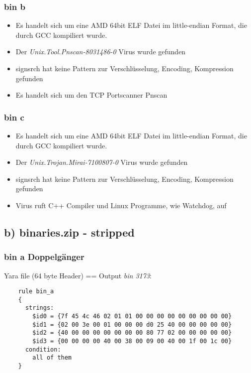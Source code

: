 \subsubsection*{bin b}

\begin{itemize}
    \item Es handelt sich um eine AMD 64bit ELF Datei im little-endian Format, die durch GCC kompiliert wurde.
    \item Der \textit{Unix.Tool.Pnscan-8031486-0} Virus wurde gefunden
    \item signsrch hat keine Pattern zur Verschlüsselung, Encoding, Kompression gefunden
    \item Es handelt sich um den TCP Portscanner Pnscan
\end{itemize}

\subsubsection*{bin c}

\begin{itemize}
    \item Es handelt sich um eine AMD 64bit ELF Datei im little-endian Format, die durch GCC kompiliert wurde.
    \item Der \textit{Unix.Trojan.Mirai-7100807-0} Virus wurde gefunden
    \item signsrch hat keine Pattern zur Verschlüsselung, Encoding, Kompression gefunden
    \item Virus ruft C++ Compiler und Linux Programme, wie Watchdog, auf
\end{itemize}

\subsection*{b) binaries.zip - stripped}

\subsubsection*{bin a Doppelgänger}

Yara file (64 byte Header) == Output \textit{bin 3173}:

\begin{lstlisting}
    rule bin_a
    {
      strings:
        $id0 = {7f 45 4c 46 02 01 01 00 00 00 00 00 00 00 00 00}
        $id1 = {02 00 3e 00 01 00 00 00 d0 25 40 00 00 00 00 00}
        $id2 = {40 00 00 00 00 00 00 00 80 77 02 00 00 00 00 00}
        $id3 = {00 00 00 00 40 00 38 00 09 00 40 00 1f 00 1c 00}
      condition:
        all of them
    }
\end{lstlisting}

